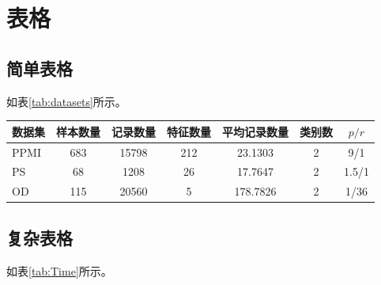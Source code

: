



\section{表格}
\subsection{简单表格}
如表\ref{tab:datasets}所示。

\begin{table}[htbp]
  \centering
  \vspace{0.2cm}
  \zhongwu
  \begin{tabular}{lcccccc}
  \toprule
  数据集 & 样本数量 & 记录数量 & 特征数量 & 平均记录数量 & 类别数 & $p/r$\\
  \midrule
  PPMI & 683 & 15798 & 212 & 23.1303 & 2 & 9/1 \\
  PS & 68 & 1208 & 26 & 17.7647 & 2 & 1.5/1 \\
  OD & 115 & 20560 & 5 & 178.7826 & 2 & 1/36 \\
  \bottomrule
  \end{tabular}
\end{table}

\subsection{复杂表格}
如表\ref{tab:Time}所示。

